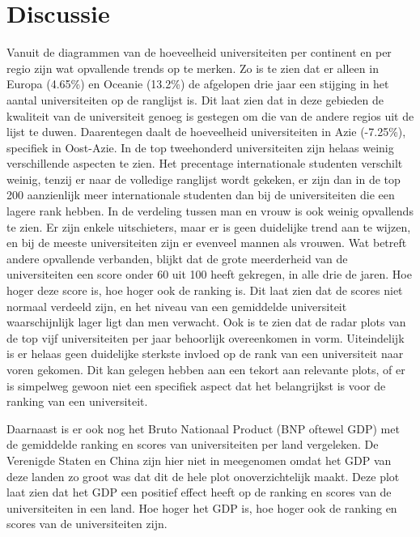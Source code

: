 \documentclass{uva-inf-article}
\begin{document}
\section{Discussie}





Vanuit de diagrammen van de hoeveelheid universiteiten per continent en per regio zijn wat
opvallende trends op te merken. Zo is te zien dat er alleen in Europa (4.65\%) en Oceanie (13.2\%) de
afgelopen drie jaar een stijging in het aantal universiteiten op de ranglijst is. Dit laat zien dat in deze gebieden de kwaliteit van de universiteit genoeg is gestegen om die van de andere regios uit de lijst te duwen. Daarentegen daalt de hoeveelheid universiteiten in Azie (-7.25\%), specifiek in Oost-Azie. In de top tweehonderd universiteiten zijn helaas weinig verschillende aspecten te zien. Het precentage
internationale studenten verschilt weinig, tenzij er naar de volledige ranglijst wordt gekeken, er zijn dan in de top 200 aanzienlijk meer internationale studenten dan bij de universiteiten die een lagere rank hebben. In de verdeling tussen man en vrouw is ook weinig opvallends te zien. Er zijn enkele uitschieters, maar er is geen duidelijke trend aan te wijzen, en bij de meeste universiteiten zijn er evenveel mannen als vrouwen. Wat betreft andere opvallende verbanden, blijkt dat de grote meerderheid van de universiteiten een  score onder 60 uit 100 heeft gekregen, in alle drie de jaren. Hoe hoger deze score is, hoe hoger ook de ranking is. Dit laat zien dat de scores niet normaal verdeeld zijn, en het niveau van een gemiddelde universiteit waarschijnlijk lager ligt dan men verwacht. Ook is te zien dat de radar plots van de top vijf universiteiten per jaar behoorlijk overeenkomen in vorm. Uiteindelijk is er helaas geen duidelijke sterkste invloed op de rank van een universiteit naar voren gekomen. Dit kan gelegen hebben aan een tekort aan relevante plots, of er is simpelweg gewoon niet een specifiek aspect dat het belangrijkst is voor de ranking van een universiteit.

Daarnaast is er ook nog het Bruto Nationaal Product (BNP oftewel GDP) met de gemiddelde ranking en scores van universiteiten per land vergeleken. De Verenigde Staten en China zijn hier niet in meegenomen omdat het GDP van deze landen zo groot was dat dit de hele plot onoverzichtelijk maakt. Deze plot laat zien dat het GDP een positief effect heeft op de ranking en scores van de universiteiten in een land. Hoe hoger het GDP is, hoe hoger ook de ranking en scores van de universiteiten zijn.
\end{document}
